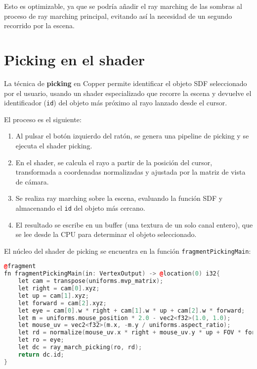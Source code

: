 Esto es optimizable, ya que se podría añadir el ray marching de las sombras al
proceso de ray marching principal, evitando así la necesidad de un segundo
recorrido por la escena.

\section{Picking en el shader}

La técnica de \textbf{picking} en Copper permite identificar el objeto SDF
seleccionado por el usuario, usando un shader especializado que recorre la
escena y devuelve el identificador (\texttt{id}) del objeto más próximo al rayo
lanzado desde el cursor.

El proceso es el siguiente:

\begin{enumerate}
    \item Al pulsar el botón izquierdo del ratón, se genera una pipeline de picking y se
          ejecuta el shader picking.
    \item En el shader, se calcula el rayo a partir de la posición del cursor,
          transformada a coordenadas normalizadas y ajustada por la matriz de vista de
          cámara.
    \item Se realiza ray marching sobre la escena, evaluando la función SDF y almacenando
          el \texttt{id} del objeto más cercano.
    \item El resultado se escribe en un buffer (una textura de un solo canal entero), que
          se lee desde la CPU para determinar el objeto seleccionado.
\end{enumerate}

El núcleo del shader de picking se encuentra en la función
\texttt{fragmentPickingMain}:

\begin{lstlisting}[language=C++, caption={Picking shader fragment}]
@fragment
fn fragmentPickingMain(in: VertexOutput) -> @location(0) i32{
    let cam = transpose(uniforms.mvp_matrix);
    let right = cam[0].xyz;
    let up = cam[1].xyz;
    let forward = cam[2].xyz;
    let eye = cam[0].w * right + cam[1].w * up + cam[2].w * forward;
    let m = uniforms.mouse_position * 2.0 - vec2<f32>(1.0, 1.0);
    let mouse_uv = vec2<f32>(m.x, -m.y / uniforms.aspect_ratio);
    let rd = normalize(mouse_uv.x * right + mouse_uv.y * up + FOV * forward);
    let ro = eye;
    let dc = ray_march_picking(ro, rd);
    return dc.id;
}
\end{lstlisting}

